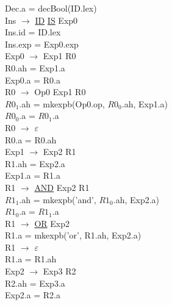 \documentclass[\main/MemoriaPL.tex]{subfiles}
\begin{document}
    \hspace{5mm}Dec.a = decBool(ID.lex)\\
    Ins $\rightarrow$ \underline{ID} \underline{IS} Exp0\\
    \hspace{5mm}Ins.id = ID.lex\\
    \hspace{5mm}Ins.exp = Exp0.exp\\
    Exp0 $\rightarrow$ Exp1 R0\\
    \hspace{5mm}R0.ah = Exp1.a\\
    \hspace{5mm}Exp0.a = R0.a\\
    R0 $\rightarrow$ Op0 Exp1 R0\\
    \hspace{5mm}$R0_1$.ah = mkexpb(Op0.op, $R0_0$.ah, Exp1.a)\\
    \hspace{5mm}$R0_0$.a = $R0_1$.a\\
    R0 $\rightarrow$ $\varepsilon$\\
    \hspace{5mm}R0.a = R0.ah\\
    Exp1 $\rightarrow$ Exp2 R1\\
    \hspace{5mm}R1.ah = Exp2.a\\
    \hspace{5mm}Exp1.a = R1.a\\
    R1 $\rightarrow$ \underline{AND} Exp2 R1\\
    \hspace{5mm}$R1_1$.ah = mkexpb('and', $R1_0$.ah, Exp2.a)\\
    \hspace{5mm}$R1_0$.a = $R1_1$.a\\
    R1 $\rightarrow$ \underline{OR} Exp2\\
    \hspace{5mm}R1.a = mkexpb('or', R1.ah, Exp2.a)\\
    R1 $\rightarrow$ $\varepsilon$\\
    \hspace{5mm}R1.a = R1.ah\\
    Exp2 $\rightarrow$ Exp3 R2\\
    \hspace{5mm}R2.ah = Exp3.a\\
    \hspace{5mm}Exp2.a = R2.a\\
\end{document}
